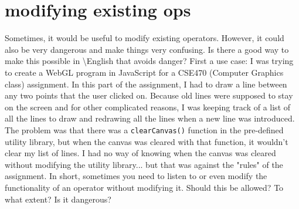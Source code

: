 \documentclass{article}
\newcommand{\name}{\textbackslash{}English}
\begin{document}
\section{modifying existing ops}
\indent Sometimes, it would be useful to modify existing operators. However, it could also be very dangerous and make things very confusing. Is there a good way to make this possible in \name{} that avoids danger?
\indent First a use case: I was trying to create a WebGL program in JavaScript for a CSE470 (Computer Graphics class) assignment. In this part of the assignment, I had to draw a line between any two points that the user clicked on. Because old lines were supposed to stay on the screen and for other complicated reasons, I was keeping track of a list of all the lines to draw and redrawing all the lines when a new line was introduced. The problem was that there was a \texttt{clearCanvas()} function in the pre-defined utility library, but when the canvas was cleared with that function, it wouldn't clear my list of lines. I had no way of knowing when the canvas was cleared without modifying the utility library... but that was against the "rules" of the assignment. In short, sometimes you need to listen to or even modify the functionality of an operator without modifying it. Should this be allowed? To what extent? Is it dangerous?
\end{document}
